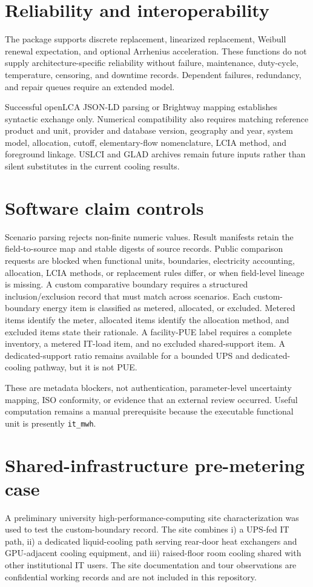 \documentclass[review,12pt]{elsarticle}
\begin{document}
\section{Reliability and interoperability}
The package supports discrete replacement, linearized replacement, Weibull renewal expectation, and optional Arrhenius acceleration. These functions do not supply architecture-specific reliability without failure, maintenance, duty-cycle, temperature, censoring, and downtime records. Dependent failures, redundancy, and repair queues require an extended model.

Successful openLCA JSON-LD parsing or Brightway mapping establishes syntactic exchange only. Numerical compatibility also requires matching reference product and unit, provider and database version, geography and year, system model, allocation, cutoff, elementary-flow nomenclature, LCIA method, and foreground linkage. USLCI and GLAD archives remain future inputs rather than silent substitutes in the current cooling results.

\section{Software claim controls}
Scenario parsing rejects non-finite numeric values. Result manifests retain the field-to-source map and stable digests of source records. Public comparison requests are blocked when functional units, boundaries, electricity accounting, allocation, LCIA methods, or replacement rules differ, or when field-level lineage is missing. A custom comparative boundary requires a structured inclusion/exclusion record that must match across scenarios. Each custom-boundary energy item is classified as metered, allocated, or excluded. Metered items identify the meter, allocated items identify the allocation method, and excluded items state their rationale. A facility-PUE label requires a complete inventory, a metered IT-load item, and no excluded shared-support item. A dedicated-support ratio remains available for a bounded UPS and dedicated-cooling pathway, but it is not PUE.

These are metadata blockers, not authentication, parameter-level uncertainty mapping, ISO conformity, or evidence that an external review occurred. Useful computation remains a manual prerequisite because the executable functional unit is presently \texttt{it\_mwh}.

\section{Shared-infrastructure pre-metering case}
A preliminary university high-performance-computing site characterization was used to test the custom-boundary record. The site combines i) a UPS-fed IT path, ii) a dedicated liquid-cooling path serving rear-door heat exchangers and GPU-adjacent cooling equipment, and iii) raised-floor room cooling shared with other institutional IT users. The site documentation and tour observations are confidential working records and are not included in this repository.
\end{document}
